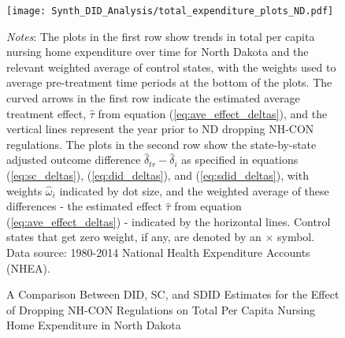 \documentclass[../Main.tex]{subfiles}
\begin{document}
\newpage
\begin{figure}[t] 
	\begin{center}
	\caption{\label{fig:tot_exp_plots_nd} \centering A Comparison Between DID, SC, and SDID Estimates for the Effect of Dropping NH-CON Regulations on Total Per Capita Nursing Home Expenditure in North Dakota}
    \texttt{[image: Synth\_DID\_Analysis/total\_expenditure\_plots\_ND.pdf]}
    \end{center}
    \footnotesize
		\textit{Notes}: The plots in the first row show trends in total per capita nursing home expenditure over time for North Dakota and the relevant weighted average of control states, with the weights used to average pre-treatment time periods at the bottom of the plots. The curved arrows in the first row indicate the estimated average treatment effect, $\hat{\tau}$ from equation (\ref{eq:ave_effect_deltas}), and the vertical lines represent the year prior to ND dropping NH-CON regulations. The plots in the second row show the state-by-state adjusted outcome difference $\hat{\delta}_{tr}-\hat{\delta}_i$ as specified in equations (\ref{eq:sc_deltas}), (\ref{eq:did_deltas}), and (\ref{eq:sdid_deltas}), with weights $\hat{\omega}_i$ indicated by dot size, and the weighted average of these differences - the estimated effect $\hat{\tau}$ from equation (\ref{eq:ave_effect_deltas}) - indicated by the horizontal lines. Control states that get zero weight, if any, are denoted by an $\times$ symbol. Data source: 1980-2014 National Health Expenditure Accounts (NHEA).
\end{figure}
\clearpage
\end{document}
